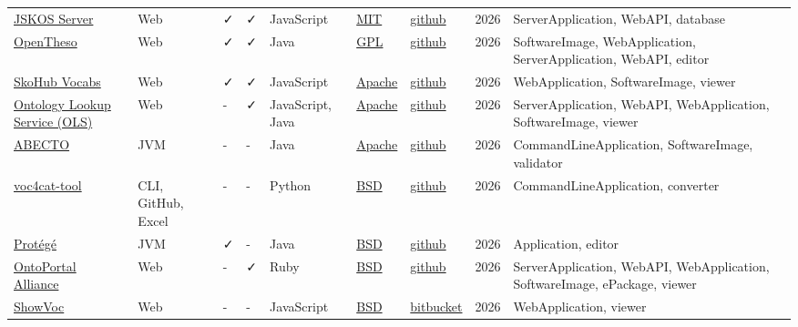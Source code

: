 \documentclass[
  DIV=10]{article}
\begin{document}
\begin{longtable}[]{@{}lllllllll@{}}
\href{https://github.com/gbv/jskos-server}{JSKOS Server} & Web & ✓ & ✓ &
JavaScript & \href{https://spdx.org/licenses/MIT}{MIT} &
\href{https://github.com/gbv/jskos-server}{github} & 2026 &
ServerApplication, WebAPI, database \\
\href{https://opentheso.hypotheses.org/}{OpenTheso} & Web & ✓ & ✓ & Java
& \href{https://spdx.org/licenses/GPL-3.0-or-later}{GPL} &
\href{https://github.com/miledrousset/Opentheso}{github} & 2026 &
SoftwareImage, WebApplication, ServerApplication, WebAPI, editor \\
\href{https://github.com/skohub-io/skohub-vocabs}{SkoHub Vocabs} & Web &
✓ & ✓ & JavaScript & \href{https://spdx.org/licenses/Apache-2.0}{Apache}
& \href{https://github.com/skohub-io/skohub-vocabs}{github} & 2026 &
WebApplication, SoftwareImage, viewer \\
\href{https://github.com/EBISPOT/ols4}{Ontology Lookup Service (OLS)} &
Web & - & ✓ & JavaScript, Java &
\href{https://spdx.org/licenses/Apache-2.0}{Apache} &
\href{https://github.com/EBISPOT/ols4}{github} & 2026 &
ServerApplication, WebAPI, WebApplication, SoftwareImage, viewer \\
\href{https://github.com/fusion-jena/abecto}{ABECTO} & JVM & - & - &
Java & \href{https://spdx.org/licenses/Apache-2.0}{Apache} &
\href{https://github.com/fusion-jena/abecto}{github} & 2026 &
CommandLineApplication, SoftwareImage, validator \\
\href{https://github.com/nfdi4cat/voc4cat-tool/}{voc4cat-tool} & CLI,
GitHub, Excel & - & - & Python &
\href{https://spdx.org/licenses/BSD-3-Clause}{BSD} &
\href{https://github.com/nfdi4cat/voc4cat-tool/}{github} & 2026 &
CommandLineApplication, converter \\
\href{https://protege.stanford.edu/}{Protégé} & JVM & ✓ & - & Java &
\href{https://spdx.org/licenses/BSD-3-Clause}{BSD} &
\href{https://github.com/protegeproject/protege}{github} & 2026 &
Application, editor \\
\href{https://ontoportal.org/}{OntoPortal Alliance} & Web & - & ✓ & Ruby
& \href{https://spdx.org/licenses/BSD-3-Clause}{BSD} &
\href{https://github.com/ontoportal}{github} & 2026 & ServerApplication,
WebAPI, WebApplication, SoftwareImage, ePackage, viewer \\
\href{https://showvoc.uniroma2.it/}{ShowVoc} & Web & - & - & JavaScript
& \href{https://spdx.org/licenses/BSD-3-Clause}{BSD} &
\href{https://bitbucket.org/art-uniroma2/showvoc/src/master/}{bitbucket}
& 2026 & WebApplication, viewer \\

\end{longtable}
\end{document}

